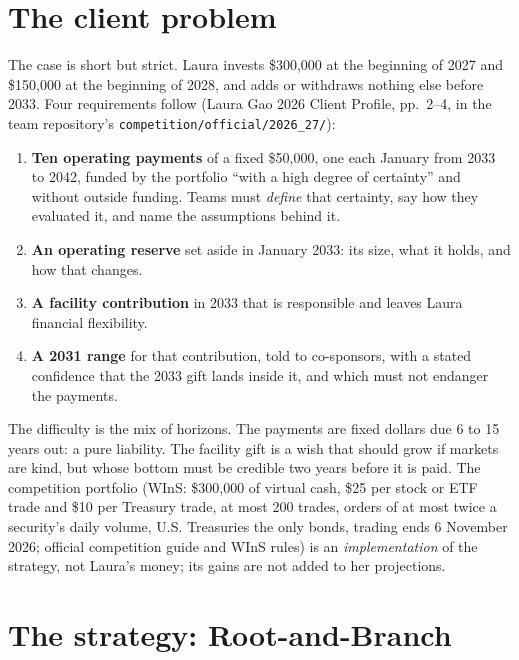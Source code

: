 \documentclass[11pt,a4paper]{article}
\begin{document}
\section{The client problem}

The case is short but strict. Laura invests \$300,000 at the
beginning of 2027 and \$150,000 at the beginning of 2028, and adds or withdraws nothing else before 2033. Four
requirements follow (Laura Gao 2026 Client Profile, pp.~2--4, in the team repository's \texttt{competition/official/2026\_27/}):

\begin{enumerate}
  \item \textbf{Ten operating payments} of a fixed \$50,000, one each January from 2033 to 2042, funded by the
  portfolio ``with a high degree of certainty'' and without outside funding. Teams must \emph{define} that
  certainty, say how they evaluated it, and name the assumptions behind it.
  \item \textbf{An operating reserve} set aside in January 2033: its size, what it holds, and how that changes.
  \item \textbf{A facility contribution} in 2033 that is responsible and leaves Laura financial flexibility.
  \item \textbf{A 2031 range} for that contribution, told to co-sponsors, with a stated confidence that the 2033 gift
  lands inside it, and which must not endanger the payments.
\end{enumerate}

The difficulty is the mix of horizons. The payments are fixed dollars due 6 to 15 years out: a pure liability. The
facility gift is a wish that should grow if markets are kind, but whose bottom must be credible two years before it
is paid. The competition portfolio (WInS: \$300,000 of virtual cash, \$25 per stock or ETF trade and \$10 per Treasury
trade, at most 200 trades, orders of at most twice a security's daily volume, U.S. Treasuries the only bonds, trading ends 6 November 2026; official competition guide and WInS rules) is an
\emph{implementation} of the strategy, not Laura's money; its gains are not added to her projections.

\section{The strategy: Root-and-Branch}\label{sec:strategy}
\end{document}
